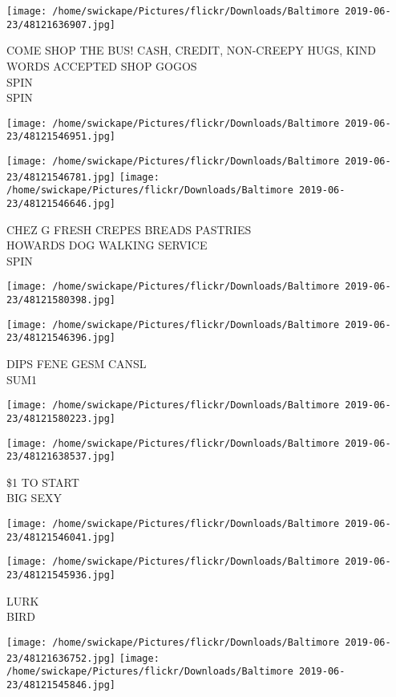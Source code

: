 \documentclass[10pt,letterpaper]{article}
\begin{document}
\texttt{[image: /home/swickape/Pictures/flickr/Downloads/Baltimore 2019-06-23/48121636907.jpg]}

COME SHOP THE BUS!  CASH, CREDIT, NON{-}CREEPY HUGS, KIND WORDS ACCEPTED SHOP GOGOS\\
SPIN\\
SPIN
\pagebreak

\texttt{[image: /home/swickape/Pictures/flickr/Downloads/Baltimore 2019-06-23/48121546951.jpg]}

\vspace{0.25in}
\texttt{[image: /home/swickape/Pictures/flickr/Downloads/Baltimore 2019-06-23/48121546781.jpg]}
\texttt{[image: /home/swickape/Pictures/flickr/Downloads/Baltimore 2019-06-23/48121546646.jpg]}

CHEZ G FRESH CREPES BREADS PASTRIES\\
HOWARDS DOG WALKING SERVICE\\
SPIN
\pagebreak

\texttt{[image: /home/swickape/Pictures/flickr/Downloads/Baltimore 2019-06-23/48121580398.jpg]}

\vspace{0.25in}
\texttt{[image: /home/swickape/Pictures/flickr/Downloads/Baltimore 2019-06-23/48121546396.jpg]}

DIPS FENE GESM CANSL\\
SUM1
\pagebreak

\texttt{[image: /home/swickape/Pictures/flickr/Downloads/Baltimore 2019-06-23/48121580223.jpg]}

\vspace{0.25in}
\texttt{[image: /home/swickape/Pictures/flickr/Downloads/Baltimore 2019-06-23/48121638537.jpg]}

\$1 TO START\\
BIG SEXY
\pagebreak

\texttt{[image: /home/swickape/Pictures/flickr/Downloads/Baltimore 2019-06-23/48121546041.jpg]}

\vspace{0.25in}
\texttt{[image: /home/swickape/Pictures/flickr/Downloads/Baltimore 2019-06-23/48121545936.jpg]}

LURK\\
BIRD
\pagebreak

\texttt{[image: /home/swickape/Pictures/flickr/Downloads/Baltimore 2019-06-23/48121636752.jpg]}
\texttt{[image: /home/swickape/Pictures/flickr/Downloads/Baltimore 2019-06-23/48121545846.jpg]}
\end{document}
